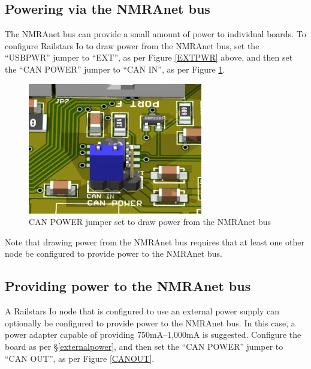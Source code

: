 \documentclass[12pt]{book}
\begin{document}
\subsection{Powering via the NMRAnet bus}

The NMRAnet bus can provide a small amount of power to individual boards. To configure Railstars Io to draw power from the NMRAnet bus, set the ``USBPWR'' jumper to ``EXT'', as per Figure \ref{EXTPWR} above, and then set the ``CAN POWER'' jumper to ``CAN IN'', as per Figure \ref{CANIN}.

\begin{figure}[htbp]
\begin{center}
\includegraphics[width=3in]{images/IoCANPowerIn.png}
\caption{CAN POWER jumper set to draw power from the NMRAnet bus}
\label{CANIN}
\end{center}
\end{figure}

Note that drawing power from the NMRAnet bus requires that at least one other node be configured to provide power to the NMRAnet bus.

\subsection{Providing power to the NMRAnet bus}

A Railstars Io node that is configured to use an external power supply can optionally be configured to provide power to the NMRAnet bus. In this case, a power adapter capable of providing 750mA--1,000mA is suggested. Configure the board as per \S\ref{externalpower}, and then set the ``CAN POWER'' jumper to ``CAN OUT'', as per Figure \ref{CANOUT}.
\end{document}
